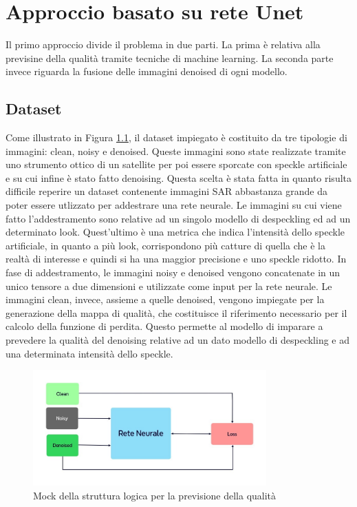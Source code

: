 
\chapter{Approccio basato su rete Unet}
Il primo approccio divide il problema in due parti. La prima è relativa alla previsine della qualità tramite tecniche 
di machine learning. La seconda parte invece riguarda la fusione delle immagini denoised di ogni modello.

\section{Dataset}

Come illustrato in Figura \ref{fig:MockReteNeurale}, il dataset impiegato è costituito da tre tipologie di 
immagini: clean, noisy e denoised. Queste immagini sono state realizzate tramite uno strumento ottico di un
satellite per poi essere sporcate con speckle artificiale e su cui infine è stato fatto denoising. Questa scelta è stata fatta
in quanto risulta difficile reperire un dataset contenente immagini SAR abbastanza grande da poter essere utlizzato per 
addestrare una rete neurale. Le immagini su cui viene fatto l'addestramento sono relative ad un singolo modello di despeckling ed ad 
un determinato look. Quest'ultimo è una metrica che indica l'intensità dello speckle artificiale, in quanto a più look,
corrispondono più catture di quella che è la realtà di interesse e quindi si ha una maggior precisione e uno speckle ridotto.
In fase di addestramento, le immagini noisy e denoised vengono concatenate in un unico tensore a due dimensioni e utilizzate come 
input per la rete neurale. Le immagini clean, invece, assieme a quelle denoised, vengono impiegate per la 
generazione della mappa di qualità, che costituisce il riferimento necessario per 
il calcolo della funzione di perdita. Questo permette al modello di imparare a 
prevedere la qualità del denoising relative ad un dato modello di despeckling e ad una determinata intensità dello speckle. 
\begin{figure}[H]
    \centering
    \includegraphics[width=0.8\textwidth]{utils/Architettura_rete_neurale.jpg}
    \caption{Mock della struttura logica per la previsione della qualità}
    \label{fig:MockReteNeurale}
\end{figure}

